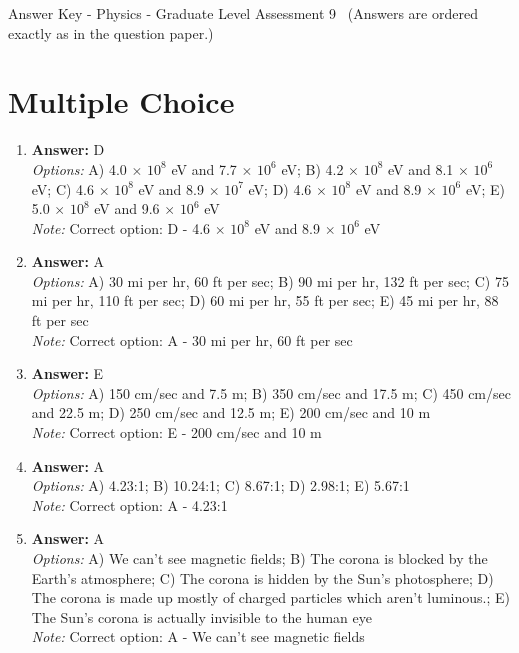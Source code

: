 \documentclass[12pt]{article}
\begin{document}
\begin{center}
Answer Key - Physics - Graduate Level Assessment 9 \
\small (Answers are ordered exactly as in the question paper.)
\end{center}

\section*{Multiple Choice}
\begin{enumerate}[label=\arabic*.]
\item \textbf{Answer:} D
\\ \textit{Options:} A) 4.0 \ensuremath{\times} $10^8$ eV and 7.7 \ensuremath{\times} $10^6$ eV; B) 4.2 \ensuremath{\times} $10^8$ eV and 8.1 \ensuremath{\times} $10^6$ eV; C) 4.6 \ensuremath{\times} $10^8$ eV and 8.9 \ensuremath{\times} $10^7$ eV; D) 4.6 \ensuremath{\times} $10^8$ eV and 8.9 \ensuremath{\times} $10^6$ eV; E) 5.0 \ensuremath{\times} $10^8$ eV and 9.6 \ensuremath{\times} $10^6$ eV
\\ \textit{Note:} Correct option: D - 4.6 \ensuremath{\times} $10^8$ eV and 8.9 \ensuremath{\times} $10^6$ eV
\item \textbf{Answer:} A
\\ \textit{Options:} A) 30 mi per hr, 60 ft per sec; B) 90 mi per hr, 132 ft per sec; C) 75 mi per hr, 110 ft per sec; D) 60 mi per hr, 55 ft per sec; E) 45 mi per hr, 88 ft per sec
\\ \textit{Note:} Correct option: A - 30 mi per hr, 60 ft per sec
\item \textbf{Answer:} E
\\ \textit{Options:} A) 150 cm/sec and 7.5 m; B) 350 cm/sec and 17.5 m; C) 450 cm/sec and 22.5 m; D) 250 cm/sec and 12.5 m; E) 200 cm/sec and 10 m
\\ \textit{Note:} Correct option: E - 200 cm/sec and 10 m
\item \textbf{Answer:} A
\\ \textit{Options:} A) 4.23:1; B) 10.24:1; C) 8.67:1; D) 2.98:1; E) 5.67:1
\\ \textit{Note:} Correct option: A - 4.23:1
\item \textbf{Answer:} A
\\ \textit{Options:} A) We can't see magnetic fields; B) The corona is blocked by the Earth's atmosphere; C) The corona is hidden by the Sun's photosphere; D) The corona is made up mostly of charged particles which aren't luminous.; E) The Sun's corona is actually invisible to the human eye
\\ \textit{Note:} Correct option: A - We can't see magnetic fields
\end{enumerate}
\end{document}
